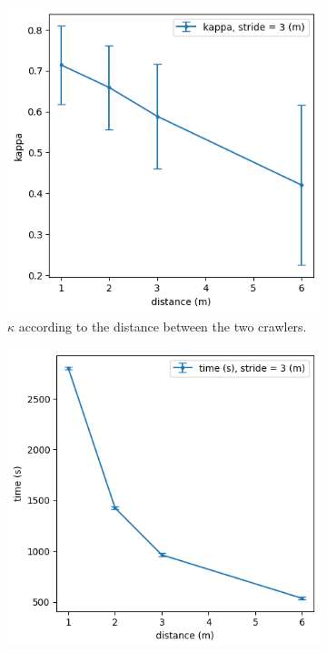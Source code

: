 \documentclass[english,RandD]{rapportPFE}  %
\begin{document}
			\begin{figure}[h!]
				\begin{subfigure}[t]{0.49\linewidth}
					\includegraphics[width=\linewidth]{graphics/ski_nordique-kappa_vs_distance.png}
					\caption{$\kappa$ according to the distance between the two crawlers.}
					\label{fig:ski_nordique-kappa_vs_distance}
				\end{subfigure}
				\hfill
				\begin{subfigure}[t]{0.49\linewidth}
					\includegraphics[width=\linewidth]{graphics/ski_nordique-time_vs_distance.png}

\end{subfigure}
\end{figure}
\end{document}
